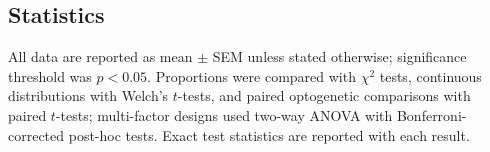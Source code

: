 \documentclass[11pt]{article}
\begin{document}
\subsection{Statistics}

All data are reported as mean $\pm$ SEM unless stated otherwise; significance threshold was $p<0.05$. Proportions were compared with $\chi^2$ tests, continuous distributions with Welch's $t$-tests, and paired optogenetic comparisons with paired $t$-tests; multi-factor designs used two-way ANOVA with Bonferroni-corrected post-hoc tests. Exact test statistics are reported with each result.



\end{document}
